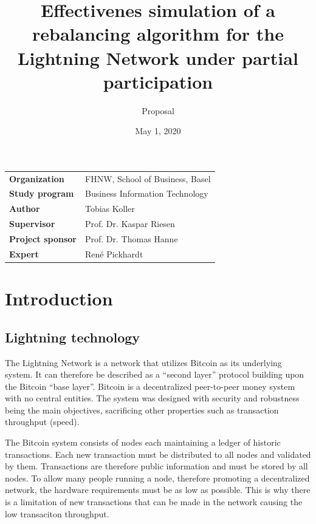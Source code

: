 \documentclass[final]{fhnwreport}       %
\title{Effectivenes simulation of a rebalancing
algorithm for the Lightning Network under partial
participation}          %
\author{Proposal}          %
\date{May 1, 2020}             %
\begin{document}
\maketitle

\vspace*{-1cm}						    %
\vfill

{
\renewcommand\arraystretch{2}
\begin{center}
\begin{tabular}{>{\bf}p{4cm} l}
Organization                  &    FHNW, School of Business, Basel\\
Study program                 &    Business Information Technology\\
Author   	                  &    Tobias Koller\\
Supervisor                    &    Prof. Dr. Kaspar Riesen\\
Project sponsor               &    Prof. Dr. Thomas Hanne\\
Expert                        &    René Pickhardt
\end{tabular}
\end{center}
}
\clearpage

\section{Introduction}

\subsection{Lightning technology}

The Lightning Network is a network that utilizes Bitcoin as its underlying system. It can therefore be described as a ``second layer'' protocol building upon the Bitcoin ``base layer''. Bitcoin is a decentralized peer-to-peer money system with no central entities. The system was designed with security and robustness being the main objectives, sacrificing other properties such as transaction throughput (speed). 

The Bitcoin system consists of nodes each maintaining a ledger of historic transactions. Each new transaction must be distributed to all nodes and validated by them. Transactions are therefore public information and must be stored by all nodes. To allow many people running a node, therefore promoting a decentralized network, the hardware requirements must be as low as possible. This is why there is a limitation of new transactions that can be made in the network causing the low transaciton throughput.
\end{document}
